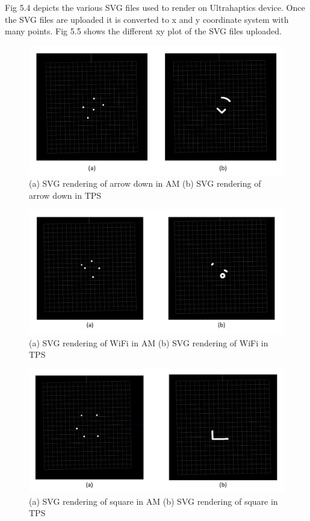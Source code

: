Fig 5.4 depicts the various SVG files used to render on Ultrahaptics device. Once the SVG files are uploaded  it is converted to x and y coordinate system with many points. Fig 5.5 shows the different xy plot of the SVG files uploaded.
 

\begin{figure}[htb]
	\includegraphics[width=\textwidth]{gfx/svg_ad.png}
	\caption{(a) SVG rendering of arrow down in AM (b) SVG rendering of arrow down in TPS}
	\label{fig:validation:svg_ad}
\end{figure}

\begin{figure}[htb]
	\includegraphics[width=\textwidth]{gfx/svg_wifi.png}
	\caption{(a) SVG rendering of WiFi in AM (b) SVG rendering of WiFi in TPS}
	\label{fig:validation:svg_wifi}
\end{figure}

\begin{figure}[htb]
	\includegraphics[width=\textwidth]{gfx/svg_sq.png}
	\caption{(a) SVG rendering of square in AM (b) SVG rendering of square in TPS}
	\label{fig:validation:svg_sq}
\end{figure}

